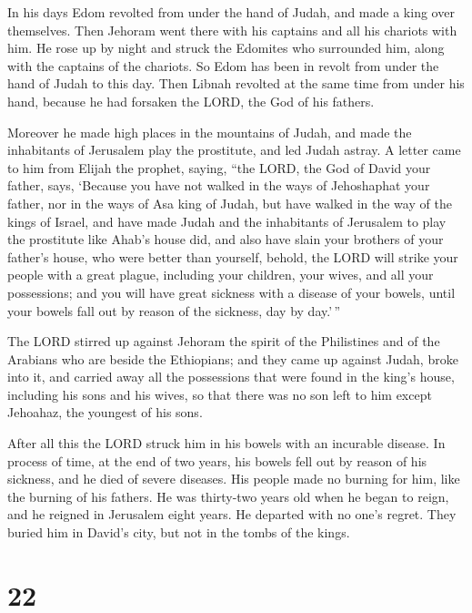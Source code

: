  In his days Edom revolted from under the hand of Judah,
and made a king over themselves.  Then Jehoram went there
with his captains and all his chariots with him. He rose up by night and
struck the Edomites who surrounded him, along with the captains of the
chariots.  So Edom has been in revolt from under the hand
of Judah to this day. Then Libnah revolted at the same time from under
his hand, because he had forsaken the LORD, the God of his fathers.

 Moreover he made high places in the mountains of Judah,
and made the inhabitants of Jerusalem play the prostitute, and led Judah
astray.  A letter came to him from Elijah the prophet,
saying, ``the LORD, the God of David your father, says, `Because you
have not walked in the ways of Jehoshaphat your father, nor in the ways
of Asa king of Judah,  but have walked in the way of the
kings of Israel, and have made Judah and the inhabitants of Jerusalem to
play the prostitute like Ahab's house did, and also have slain your
brothers of your father's house, who were better than yourself,
 behold, the LORD will strike your people with a great
plague, including your children, your wives, and all your possessions;
 and you will have great sickness with a disease of your
bowels, until your bowels fall out by reason of the sickness, day by
day.'\,''

 The LORD stirred up against Jehoram the spirit of the
Philistines and of the Arabians who are beside the Ethiopians;
 and they came up against Judah, broke into it, and
carried away all the possessions that were found in the king's house,
including his sons and his wives, so that there was no son left to him
except Jehoahaz, the youngest of his sons.

 After all this the LORD struck him in his bowels with an
incurable disease.  In process of time, at the end of two
years, his bowels fell out by reason of his sickness, and he died of
severe diseases. His people made no burning for him, like the burning of
his fathers.  He was thirty-two years old when he began
to reign, and he reigned in Jerusalem eight years. He departed with no
one's regret. They buried him in David's city, but not in the tombs of
the kings.

\hypertarget{section-21}{%
\section{22}\label{section-21}}

